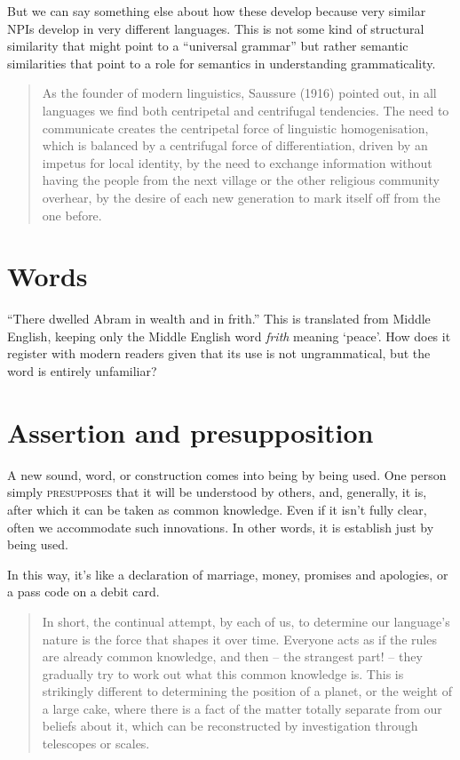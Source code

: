 But we can say something else about how these develop because very similar NPIs develop in very different languages. This is not some kind of structural similarity that might point to a ``universal grammar'' but rather semantic similarities that point to a role for semantics in understanding grammaticality.

\begin{quote}
    As the founder of modern linguistics, Saussure (1916)
pointed out, in all languages we find both centripetal and
centrifugal tendencies. The need to communicate creates
the centripetal force of linguistic homogenisation, which is
balanced by a centrifugal force of differentiation, driven by
an impetus for local identity, by the need to exchange
information without having the people from the next village
or the other religious community overhear, by the desire of
each new generation to mark itself off from the one before. \cite{Joseph2015}
\end{quote}

\section{Words}

``There dwelled Abram in wealth and in frith.'' This is translated from Middle English, keeping only the Middle English word \textit{frith} meaning `peace'. How does it register with modern readers given that its use is not ungrammatical, but the word is entirely unfamiliar?

\section{Assertion and presupposition}

A new sound, word, or construction comes into being by being used. One person simply \textsc{presupposes} that it will be understood by others, and, generally, it is, after which it can be taken as common knowledge. Even if it isn't fully clear, often we accommodate such innovations. In other words, it is establish just by being used.

In this way, it's like a declaration of marriage, money, promises and apologies, or a pass code on a debit card. 

\begin{quote}
In short, the continual attempt, by each of us, to determine our language's nature is the force that shapes it over time. Everyone acts as if the rules are already common knowledge, and then -- the strangest part! -- they gradually try to work out what this common knowledge is. This is strikingly different to determining the position of a planet, or the weight of a large cake, where there is a fact of the matter totally separate from our beliefs about it, which can be reconstructed by investigation through telescopes or scales. \hfill\citep{CohnGordon2024}
\end{quote}

